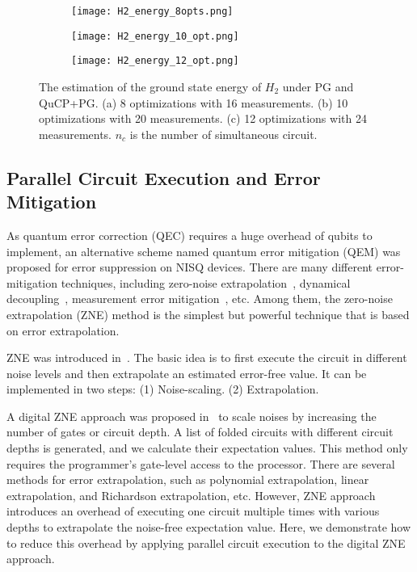 \documentclass[conference]{IEEEtran}
\begin{document}
\begin{figure*}[h]
\centering
\begin{subfigure}{0.3\linewidth}
\centering
\caption{}
\texttt{[image: H2\_energy\_8opts.png]}
\end{subfigure}
\hspace{0.5cm}
\begin{subfigure}{0.3\linewidth}
\centering
\caption{}
\texttt{[image: H2\_energy\_10\_opt.png]}
\end{subfigure}
\hspace{0.5cm}
\begin{subfigure}{0.3\linewidth}
\centering
\caption{}
\texttt{[image: H2\_energy\_12\_opt.png]}
\end{subfigure}
\caption{The estimation of the ground state energy of $H_2$ under PG and QuCP+PG. (a) 8 optimizations with 16 measurements. (b) 10 optimizations with 20 measurements. (c) 12 optimizations with 24 measurements. $n_c$ is the number of simultaneous circuit.}
\label{figure:h2}
\end{figure*}

\subsection{Parallel Circuit Execution and Error Mitigation}

As quantum error correction (QEC) requires a huge overhead of qubits to implement, an alternative scheme named quantum error mitigation (QEM) was proposed for error suppression on NISQ devices. There are many different error-mitigation techniques, including zero-noise extrapolation~\cite{li2017efficient}, dynamical decoupling~\cite{souza2012robust}, measurement error mitigation~\cite{bravyi2021mitigating}, etc. Among them, the zero-noise extrapolation (ZNE) method is the simplest but powerful technique that is based on error extrapolation.

ZNE was introduced in~\cite{li2017efficient}. The basic idea is to first execute the circuit in different noise levels and then extrapolate an estimated error-free value. It can be implemented in two steps: (1) Noise-scaling. (2) Extrapolation.


A digital ZNE approach was proposed in~\cite{giurgica2020digital} to scale noises by increasing the number of gates or circuit depth. A list of folded circuits with different circuit depths is generated, and we calculate their expectation values. This method only requires the programmer's gate-level access to the processor.
There are several methods for error extrapolation, such as polynomial extrapolation, linear extrapolation, and Richardson extrapolation, etc. 
However, ZNE approach introduces an overhead of executing one circuit multiple times with various depths to extrapolate the noise-free expectation value. Here, we demonstrate how to reduce this overhead by applying parallel circuit execution to the digital ZNE approach.
\end{document}
